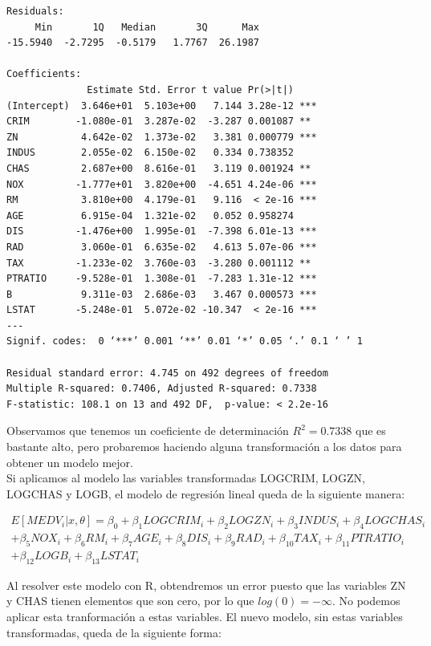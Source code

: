 \documentclass[12pt,a4paper,twoside,openright,titlepage,final]{article}
\begin{document}
\begin{verbatim}
Residuals:
     Min       1Q   Median       3Q      Max 
-15.5940  -2.7295  -0.5179   1.7767  26.1987 

Coefficients:
              Estimate Std. Error t value Pr(>|t|)    
(Intercept)  3.646e+01  5.103e+00   7.144 3.28e-12 ***
CRIM        -1.080e-01  3.287e-02  -3.287 0.001087 ** 
ZN           4.642e-02  1.373e-02   3.381 0.000779 ***
INDUS        2.055e-02  6.150e-02   0.334 0.738352    
CHAS         2.687e+00  8.616e-01   3.119 0.001924 ** 
NOX         -1.777e+01  3.820e+00  -4.651 4.24e-06 ***
RM           3.810e+00  4.179e-01   9.116  < 2e-16 ***
AGE          6.915e-04  1.321e-02   0.052 0.958274    
DIS         -1.476e+00  1.995e-01  -7.398 6.01e-13 ***
RAD          3.060e-01  6.635e-02   4.613 5.07e-06 ***
TAX         -1.233e-02  3.760e-03  -3.280 0.001112 ** 
PTRATIO     -9.528e-01  1.308e-01  -7.283 1.31e-12 ***
B            9.311e-03  2.686e-03   3.467 0.000573 ***
LSTAT       -5.248e-01  5.072e-02 -10.347  < 2e-16 ***
---
Signif. codes:  0 ‘***’ 0.001 ‘**’ 0.01 ‘*’ 0.05 ‘.’ 0.1 ‘ ’ 1 

Residual standard error: 4.745 on 492 degrees of freedom
Multiple R-squared: 0.7406,	Adjusted R-squared: 0.7338 
F-statistic: 108.1 on 13 and 492 DF,  p-value: < 2.2e-16 
\end{verbatim}

Observamos que tenemos un coeficiente de determinación $R^2 = 0.7338$ que es bastante alto, pero probaremos haciendo alguna transformación a los datos para obtener un modelo mejor.\\

Si aplicamos al modelo las variables transformadas LOGCRIM, LOGZN, LOGCHAS y LOGB, el modelo de regresión lineal queda de la siguiente manera:

\begin{multline*}
E[MEDV_i |x, \theta] = \beta_0 + \beta_1 LOGCRIM_i + \beta_2 LOGZN_i + \beta_3 INDUS_i + \beta_4 LOGCHAS_i \\ + \beta_5 NOX_i + \beta_6 RM_i + \beta_7 AGE_i + \beta_8 DIS_i + \beta_9 RAD_i + \beta_{10} TAX_i + \beta_{11} PTRATIO_i \\ + \beta_{12} LOGB_i + \beta_{13} LSTAT_i
\end{multline*}

Al resolver este modelo con R, obtendremos un error puesto que las variables ZN y CHAS tienen elementos que son cero, por lo que $log(0) = -\infty$. No podemos aplicar esta tranformación a estas variables. El nuevo modelo, sin estas variables transformadas, queda de la siguiente forma:
\end{document}

